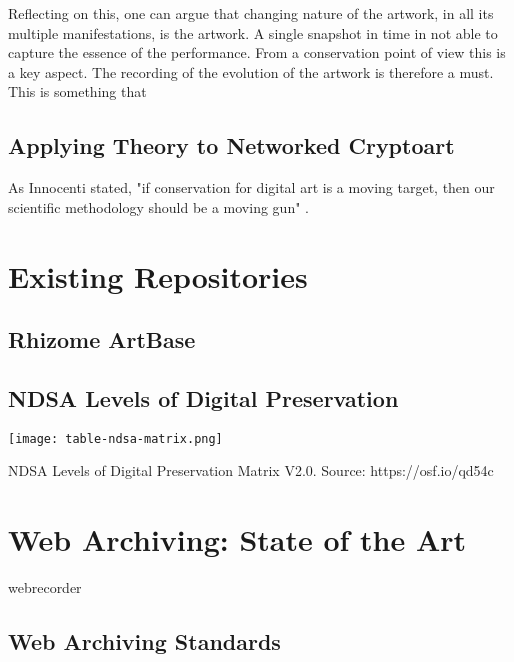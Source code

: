 Reflecting on this, one can argue that changing nature of the artwork, in all its multiple manifestations, is the artwork. A single snapshot in time in not able to capture the essence of the performance. From a conservation point of view this is a key aspect. The recording of the evolution of the artwork is therefore a must. This is something that 

\subsection{Applying Theory to Networked Cryptoart}



As Innocenti stated, "if conservation for digital art is a moving target, then our scientific methodology should be a moving gun" \citeyear[p.230]{innocentiKeepingBitsAlive2013}.



\section{Existing Repositories}

\subsection{Rhizome ArtBase}


\subsection{NDSA Levels of Digital Preservation}


\begin{table}[h!]
\centering
\captionsetup{type=table} %
\texttt{[image: table-ndsa-matrix.png]} %
\caption[NDSA Levels of Digital Preservation Matrix V2.0]{NDSA Levels of Digital Preservation Matrix V2.0. Source: https://osf.io/qd54c}
\label{tab:ndsa-levels-of-digital-preservation}
\end{table}


\section{Web Archiving: State of the Art}

webrecorder
\subsection{Web Archiving Standards}

